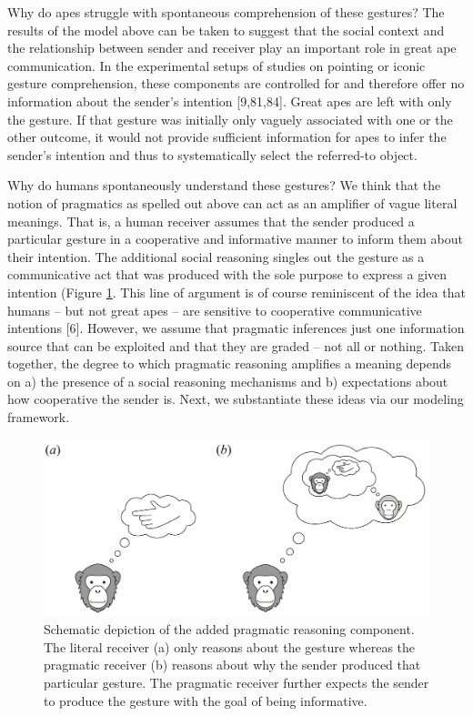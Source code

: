 \documentclass[
  man,floatsintext]{apa6}
\begin{document}
Why do apes struggle with spontaneous comprehension of these gestures? The results of the model above can be taken to suggest that the social context and the relationship between sender and receiver play an important role in great ape communication. In the experimental setups of studies on pointing or iconic gesture comprehension, these components are controlled for and therefore offer no information about the sender's intention {[}9,81,84{]}. Great apes are left with only the gesture. If that gesture was initially only vaguely associated with one or the other outcome, it would not provide sufficient information for apes to infer the sender's intention and thus to systematically select the referred-to object.

Why do humans spontaneously understand these gestures? We think that the notion of pragmatics as spelled out above can act as an amplifier of vague literal meanings. That is, a human receiver assumes that the sender produced a particular gesture in a cooperative and informative manner to inform them about their intention. The additional social reasoning singles out the gesture as a communicative act that was produced with the sole purpose to express a given intention (Figure \ref{fig:fig3}. This line of argument is of course reminiscent of the idea that humans -- but not great apes -- are sensitive to cooperative communicative intentions {[}6{]}. However, we assume that pragmatic inferences just one information source that can be exploited and that they are graded -- not all or nothing. Taken together, the degree to which pragmatic reasoning amplifies a meaning depends on a) the presence of a social reasoning mechanisms and b) expectations about how cooperative the sender is. Next, we substantiate these ideas via our modeling framework.



\begin{figure}

{\centering \includegraphics[width=1\linewidth]{./figures/Fig3} 

}

\caption{Schematic depiction of the added pragmatic reasoning component. The literal receiver (a) only reasons about the gesture whereas the pragmatic receiver (b) reasons about why the sender produced that particular gesture. The pragmatic receiver further expects the sender to produce the gesture with the goal of being informative.}\label{fig:fig3}
\end{figure}
\end{document}
